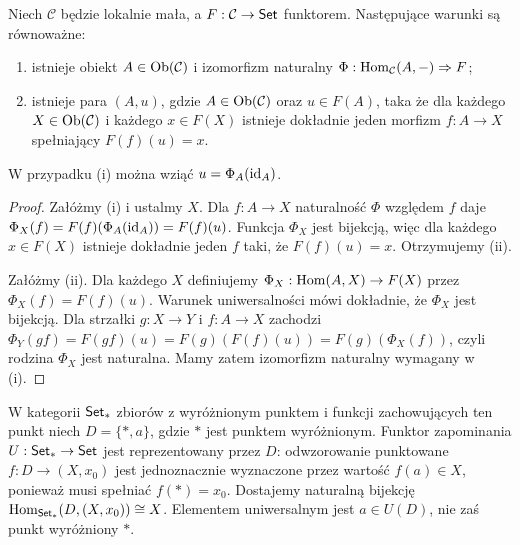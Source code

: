\begin{twierdzenie}\label{tw:univ-element}
Niech $\mathcal C$ będzie lokalnie mała, a $F:\mathcal C\to\mathsf{Set}$ funktorem. Następujące warunki są równoważne:
\begin{enumerate}[label=(\roman*)]
\item istnieje obiekt $A\in\operatorname{Ob}(\mathcal C)$ i izomorfizm naturalny $\Phi:\operatorname{Hom}_{\mathcal C}(A,-)\Rightarrow F$;
\item istnieje para $(A,u)$, gdzie $A\in\operatorname{Ob}(\mathcal C)$ oraz $u\in F(A)$, taka że dla każdego $X\in\operatorname{Ob}(\mathcal C)$ i każdego $x\in F(X)$ istnieje dokładnie jeden morfizm $f:A\to X$ spełniający $F(f)(u)=x$.
\end{enumerate}
W przypadku (i) można wziąć $u=\Phi_A(\mathrm{id}_A)$.
\end{twierdzenie}
\begin{proof}
Załóżmy (i) i ustalmy $X$. Dla $f:A\to X$ naturalność $\Phi$ względem $f$ daje $\Phi_X(f)=F(f)(\Phi_A(\mathrm{id}_A))=F(f)(u)$. Funkcja $\Phi_X$ jest bijekcją, więc dla każdego $x\in F(X)$ istnieje dokładnie jeden $f$ taki, że $F(f)(u)=x$. Otrzymujemy (ii).

Załóżmy (ii). Dla każdego $X$ definiujemy $\Phi_X:\operatorname{Hom}(A,X)\to F(X)$ przez $\Phi_X(f)=F(f)(u)$. Warunek uniwersalności mówi dokładnie, że $\Phi_X$ jest bijekcją. Dla strzałki $g:X\to Y$ i $f:A\to X$ zachodzi $\Phi_Y(gf)=F(gf)(u)=F(g)(F(f)(u))=F(g)(\Phi_X(f))$, czyli rodzina $\Phi_X$ jest naturalna. Mamy zatem izomorfizm naturalny wymagany w (i).
\end{proof}



\begin{przyklad}
W kategorii $\mathsf{Set}_*$ zbiorów z wyróżnionym punktem i funkcji zachowujących ten punkt niech $D=\{*,a\}$, gdzie $*$ jest punktem wyróżnionym. Funktor zapominania $U:\mathsf{Set}_*\to\mathsf{Set}$ jest reprezentowany przez $D$: odwzorowanie punktowane $f:D\to(X,x_0)$ jest jednoznacznie wyznaczone przez wartość $f(a)\in X$, ponieważ musi spełniać $f(*)=x_0$. Dostajemy naturalną bijekcję $\operatorname{Hom}_{\mathsf{Set}_*}(D,(X,x_0))\cong X$. Elementem uniwersalnym jest $a\in U(D)$, nie zaś punkt wyróżniony $*$.
\end{przyklad}

